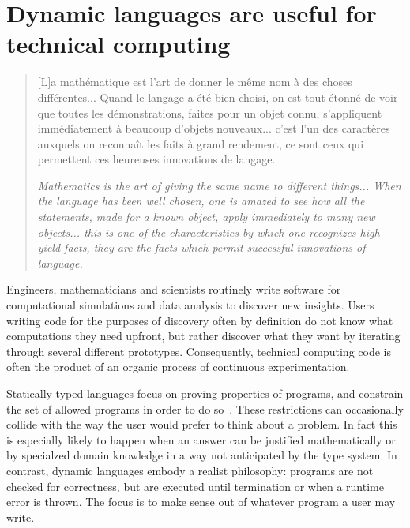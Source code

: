 \documentclass[pldi]{sigplanconf-pldi15}
\begin{document}

\section{Dynamic languages are useful for technical computing}

\begin{quote}
	[L]a math\'ematique est l'art de donner le m\^eme nom \`a des choses
	diff\'erentes... Quand le langage a \'et\'e bien choisi, on est tout
	\'etonn\'e de voir que toutes les d\'emonstrations, faites pour un
	objet connu, s'appliqu\-ent imm\'ediatement \`a beaucoup d'objets
	nouveaux... c'est l'un des caract\`eres auxquels on reconna\^it les
	faits \`a grand rendement, ce sont ceux qui permettent ces heureuses
	innovations de langage. \cite{Poincare1908}
	
	\textit{Mathematics is the art of giving the same name to different
	things... When the language has been well chosen, one is amazed to see
	how all the statements, made for a known object, apply immediately
	to many new objects... this is one of the characteristics by which one
	recognizes high-yield facts, they are the facts which permit successful
	innovations of language.}
\end{quote}

Engineers, mathematicians and scientists routinely write software for
computational simulations and data analysis to discover new insights.
Users writing code for the purposes of discovery often by definition do not
know what computations they need upfront, but rather discover what they want by
iterating through several different prototypes. Consequently, technical
computing code is often the product of an organic process of continuous
experimentation.

Statically-typed languages focus on proving properties of programs, and constrain
the set of allowed programs in order to do so~\cite{Pierce2002}.
These restrictions can occasionally collide with the way the user would
prefer to think about a problem. In fact this is especially likely to happen
when an answer can be justified mathematically or by specialzed domain
knowledge in a way not anticipated by the type system.
In contrast,
dynamic languages embody a realist philosophy: programs are not checked for
correctness, but are executed until termination or when a runtime error is
thrown. The focus is to make sense out of whatever program a user may write.
\end{document}
